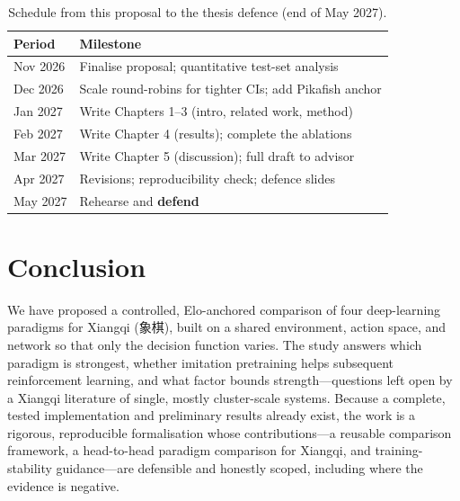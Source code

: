 \documentclass[conference]{IEEEtran}
\newcommand{\zh}[1]{{\cjkfont #1}}
\begin{document}
\begin{table}[t]
\caption{Schedule from this proposal to the thesis defence (end of May 2027).}
\label{tab:timeline}
\centering
\footnotesize
\begin{tabular}{@{}ll@{}}
\toprule
Period & Milestone \\
\midrule
Nov 2026 & Finalise proposal; quantitative test-set analysis \\
Dec 2026 & Scale round-robins for tighter CIs; add Pikafish anchor \\
Jan 2027 & Write Chapters 1--3 (intro, related work, method) \\
Feb 2027 & Write Chapter 4 (results); complete the ablations \\
Mar 2027 & Write Chapter 5 (discussion); full draft to advisor \\
Apr 2027 & Revisions; reproducibility check; defence slides \\
May 2027 & Rehearse and \textbf{defend} \\
\bottomrule
\end{tabular}
\end{table}

\section{Conclusion}
We have proposed a controlled, Elo-anchored comparison of four deep-learning
paradigms for Xiangqi (\zh{象棋}), built on a
shared environment, action space, and network so that only the decision function
varies. The study answers which paradigm is strongest, whether imitation
pretraining helps subsequent reinforcement learning, and what factor bounds
strength---questions left open by a Xiangqi literature of single, mostly
cluster-scale systems. Because a complete, tested implementation and preliminary
results already exist, the work is a rigorous, reproducible formalisation whose
contributions---a reusable comparison framework, a head-to-head paradigm
comparison for Xiangqi, and training-stability guidance---are defensible and
honestly scoped, including where the evidence is negative.



\end{document}
